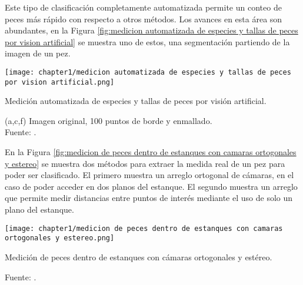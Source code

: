 Este tipo de clasificación completamente automatizada permite un conteo de peces más rápido con respecto a otros métodos.\citep[p.~2-3]{Niu2018} Los avances en esta área son abundantes, en la Figura \ref{fig:medicion automatizada de especies y tallas de peces por vision artificial} se muestra uno de estos, una segmentación partiendo de la imagen de un pez.

\begin{myfigure}[H]
	\footnotesize\centering
	\texttt{[image: chapter1/medicion automatizada de especies y tallas de peces por vision artificial.png]}
	\caption{Medición automatizada de especies y tallas de peces por visión artificial.}
	\begin{myflushcenter}
		(a,c,f) Imagen original, 100 puntos de borde y enmallado. \\
		Fuente: \citep[p.~4]{White2006}.
	\end{myflushcenter}	
	\label{fig:medicion automatizada de especies y tallas de peces por vision artificial}
\end{myfigure}

En la Figura \ref{fig:medicion de peces dentro de estanques con camaras ortogonales y estereo} se muestra dos métodos para extraer la medida real de un pez para poder ser clasificado. El primero muestra un arreglo ortogonal de cámaras, en el caso de poder acceder en dos planos del estanque. El segundo muestra un arreglo que permite medir distancias entre puntos de interés mediante el uso de solo un plano del estanque.

\begin{myfigure}[H]
	\footnotesize\centering
	\texttt{[image: chapter1/medicion de peces dentro de estanques con camaras ortogonales y estereo.png]}
	\caption{Medición de  peces dentro de estanques con cámaras ortogonales y estéreo.}
	\begin{myflushcenter}
		Fuente: \citep{Al-Jubouri2017}.
	\end{myflushcenter}	
	\label{fig:medicion de peces dentro de estanques con camaras ortogonales y estereo}
\end{myfigure}



